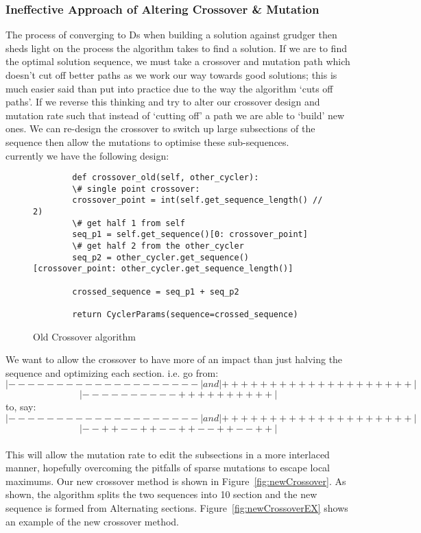 \subsubsection{Ineffective Approach of Altering Crossover \& Mutation}
The process of converging to Ds when building a solution against grudger then sheds light on the process the algorithm takes to find a solution.
If we are to find the optimal solution sequence, we must take a crossover and mutation path which doesn't cut off better paths as we work our way towards good solutions;
this is much easier said than put into practice due to the way the algorithm `cuts off paths'.
If we reverse this thinking and try to alter our crossover design and mutation rate such that instead of `cutting off' a path we are able to `build' new ones.
We can re-design the crossover to switch up large subsections of the sequence then allow the mutations to optimise these sub-sequences.\\

currently we have the following design:


\begin{figure}[ht] 
    \begin{verbatim}
        def crossover_old(self, other_cycler):
        \# single point crossover:
        crossover_point = int(self.get_sequence_length() // 2)
        \# get half 1 from self
        seq_p1 = self.get_sequence()[0: crossover_point]
        \# get half 2 from the other_cycler
        seq_p2 = other_cycler.get_sequence()[crossover_point: other_cycler.get_sequence_length()]
        
        crossed_sequence = seq_p1 + seq_p2

        return CyclerParams(sequence=crossed_sequence)
    \end{verbatim}
    \caption{Old Crossover algorithm}\label{fig:oldCrossover}
\end{figure}

We want to allow the crossover to have more of an impact than just halving the sequence and optimizing each section. i.e. go from:\\
\[|--------------------| and |++++++++++++++++++++|\]
\[|----------++++++++++|\]
to, say:\\
\[|--------------------| and |++++++++++++++++++++|\]
\[ |--++--++--++--++--++|\]\\
This will allow the mutation rate to edit the subsections in a more interlaced manner, hopefully overcoming the pitfalls of sparse mutations to escape local maximums.
Our new crossover method is shown in Figure~\ref{fig:newCrossover}.
As shown, the algorithm splits the two sequences into 10 section and the new sequence is formed from Alternating sections.
Figure~\ref{fig:newCrossoverEX} shows an example of the new crossover method.\\

